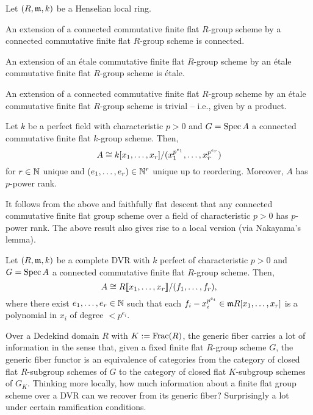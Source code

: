 \documentclass[11pt]{article}
\begin{document}
\begin{corollary}
Let $(R,\mathfrak{m},k)$ be a Henselian local ring. 
\begin{enum}{\alph}
\item An extension of a connected commutative finite flat $R$-group scheme by a connected commutative finite flat $R$-group scheme is connected.
\item An extension of an \'{e}tale commutative finite flat $R$-group scheme by an \'{e}tale commutative finite flat $R$-group scheme is \'{e}tale.
\item An extension of a connected commutative finite flat $R$-group scheme by an \'{e}tale commutative finite flat $R$-group scheme is trivial -- i.e., given by a product.
\end{enum}
\end{corollary}

\begin{theorem}
Let $k$ be a perfect field with characteristic $p>0$ and $G=\operatorname{Spec} A$ a connected commutative finite flat $k$-group scheme. Then,
$$A\cong k[x_1,\ldots,x_r]/(x_1^{p^{e_1}},\ldots,x_r^{p^{e_r}})$$
for $r\in\mathbb{N}$ unique and $(e_1,\ldots,e_r)\in\mathbb{N}^r$ unique up to reordering. Moreover, $A$ has $p$-power rank.
\end{theorem}

It follows from the above and faithfully flat descent that any connected commutative finite flat group scheme over a field of characteristic $p>0$ has $p$-power rank. The above result also gives rise to a local version (via Nakayama's lemma).

\begin{corollary}
Let $(R,\mathfrak{m},k)$ be a complete DVR with $k$ perfect of characteristic $p>0$ and $G=\operatorname{Spec} A$ a connected commutative finite flat $R$-group scheme. Then, 
$$A\cong R\llbracket x_1,\ldots,x_r\rrbracket/(f_1,\ldots,f_r),$$
where there exist $e_1,\ldots,e_r\in\mathbb{N}$ such that each $f_i-x_i^{p^{e_i}}\in\mathfrak{m} R[x_1,\ldots,x_r]$ is a polynomial in $x_i$ of degree $< p^{e_i}$.
\end{corollary}

Over a Dedekind domain $R$ with $K:=\operatorname{Frac}(R)$, the generic fiber carries a lot of information in the sense that, given a fixed finite flat $R$-group scheme $G$, the generic fiber functor is an equivalence of categories from the category of closed flat $R$-subgroup schemes of $G$ to the category of closed flat $K$-subgroup schemes of $G_K$. Thinking more locally, how much information about a finite flat group scheme over a DVR can we recover from its generic fiber? Surprisingly a lot under certain ramification conditions.
\end{document}

